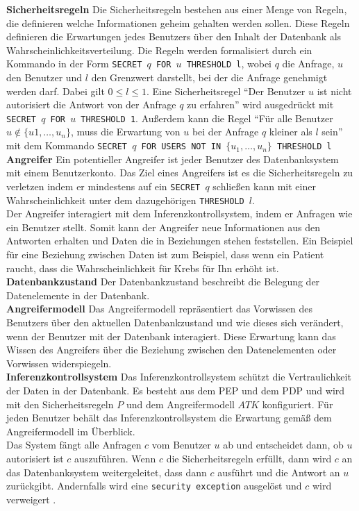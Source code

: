 \documentclass[german,version-2020-11]{uzl-thesis}
\begin{document}
\textbf{Sicherheitsregeln} Die Sicherheitsregeln bestehen aus einer Menge von Regeln, die definieren welche Informationen geheim gehalten werden sollen. Diese Regeln definieren die Erwartungen jedes Benutzers über den Inhalt der Datenbank als Wahrscheinlichkeitsverteilung. Die Regeln werden formalisiert durch ein Kommando in der Form \texttt{SECRET $q$ FOR $u$ THRESHOLD l}, wobei $q$ die Anfrage, $u$ den Benutzer und $l$ den Grenzwert darstellt, bei der die Anfrage genehmigt werden darf. Dabei gilt $0 \leq l \leq 1$. Eine Sicherheitsregel \enquote{Der Benutzer $u$ ist nicht autorisiert die Antwort von der Anfrage $q$ zu erfahren} wird ausgedrückt mit \texttt{SECRET $q$ FOR $u$ THRESHOLD 1}. Außerdem kann die Regel \enquote{Für alle Benutzer $u \notin \{u1,\dots,u_n\}$, muss die Erwartung von $u$ bei der Anfrage $q$ kleiner als $l$ sein} mit dem Kommando \texttt{SECRET $q$ FOR USERS NOT IN $\{u_1,\dots,u_n\}$ THRESHOLD l}\\ 
\textbf{Angreifer} Ein potentieller Angreifer ist jeder Benutzer des Datenbanksystem mit einem Benutzerkonto. Das Ziel eines Angreifers ist es die Sicherheitsregeln zu verletzen indem er mindestens auf ein \texttt{SECRET $q$} schließen kann mit einer Wahrscheinlichkeit unter dem dazugehörigen \texttt{THRESHOLD $l$}. \\ Der Angreifer interagiert mit dem Inferenzkontrollsystem, indem er Anfragen wie ein Benutzer stellt. Somit kann der Angreifer neue Informationen aus den Antworten erhalten und Daten die in Beziehungen stehen feststellen. Ein Beispiel für eine Beziehung zwischen Daten ist zum Beispiel, dass wenn ein Patient raucht, dass die Wahrscheinlichkeit für Krebs für Ihn erhöht ist.  \\
\textbf{Datenbankzustand} Der Datenbankzustand beschreibt die Belegung der Datenelemente in der Datenbank. \\
\textbf{Angreifermodell} Das Angreifermodell repräsentiert das Vorwissen des Benutzers über den aktuellen Datenbankzustand und wie dieses sich verändert, wenn der Benutzer mit der Datenbank interagiert. Diese Erwartung kann das Wissen des Angreifers über die Beziehung zwischen den Datenelementen oder Vorwissen widerspiegeln.\\ 
\textbf{Inferenzkontrollsystem} Das Inferenzkontrollsystem schützt die Vertraulichkeit der Daten in der Datenbank. Es besteht aus dem PEP und dem PDP und wird mit den Sicherheitsregeln $P$ und dem Angreifermodell $ATK$ konfiguriert. Für jeden Benutzer behält das Inferenzkontrollsystem die Erwartung gemäß dem Angreifermodell im Überblick.  \\
Das System fängt alle Anfragen $c$ vom Benutzer $u$ ab und entscheidet dann, ob $u$ autorisiert ist $c$ auszuführen. Wenn $c$ die Sicherheitsregeln erfüllt, dann wird $c$ an das Datenbanksystem weitergeleitet, dass dann $c$ ausführt und die Antwort an $u$ zurückgibt. Andernfalls wird eine \texttt{security exception} ausgelöst und $c$ wird verweigert \cite{6}.
\end{document}

